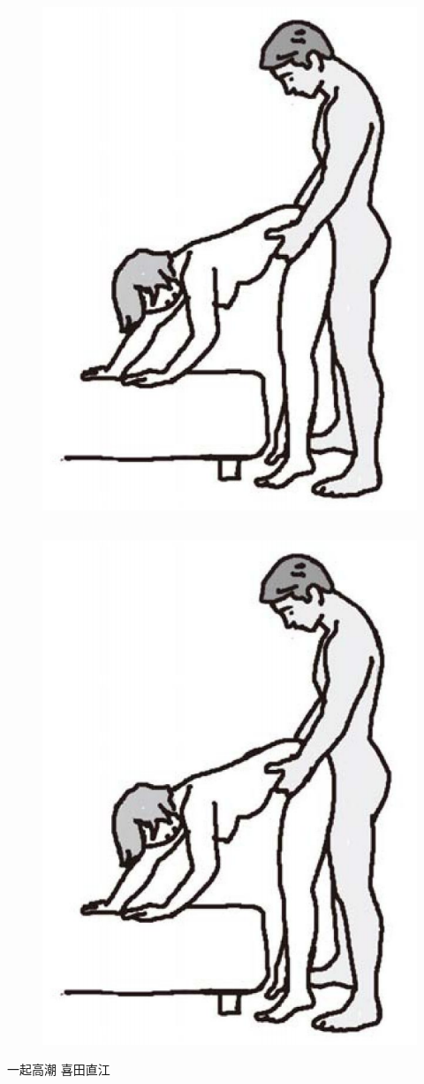 \documentclass[12pt,UTF8]{ctexbook}
\begin{document}
\begin{figure}[htbp]
\centering
\includegraphics[width=0.7\linewidth]{tw12}
\caption{}
\label{fig:1}
\end{figure}\subsection{}

\begin{figure}[htbp]
\centering
\includegraphics[width=0.7\linewidth]{tw12}
\caption{}
\label{fig:1}
\end{figure}

\backmatter

一起高潮          喜田直江
\end{document}
